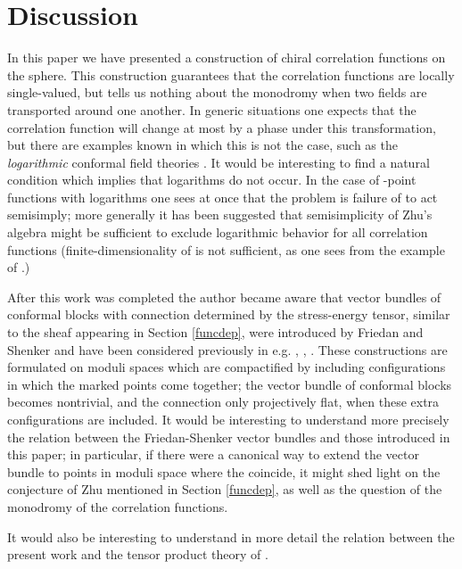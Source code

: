 \documentclass[a4paper,12pt]{article}
\providecommand{\uu}{{\mathbf u}}
\providecommand{\F}{{\mathcal H}}
\providecommand{\ti}[1]{\textit{#1}}
\begin{document}
\section{Discussion} \label{discussion}
In this paper we have presented a construction of chiral correlation functions on the sphere.  This
construction guarantees that the correlation functions are locally single-valued, but tells us nothing
about the monodromy when two fields are transported around one another.  In generic situations one expects that the
correlation function will change at most by a phase under this transformation, but there are examples known in which this
is not the case, such as the \ti{logarithmic} conformal field theories \cite{log}.  It would be interesting to find
a natural condition which implies that logarithms do not occur.  In the case of \coordHE{}-point functions with
logarithms one sees at once that the problem is failure of \coordHE{} to act semisimply; more generally 
it has been suggested \cite{Gpriv} that semisimplicity of Zhu's algebra might be sufficient to exclude
logarithmic behavior for all correlation functions (finite-dimensionality of \myHighlight{$\F / C_2$}\coordHE{} is not sufficient, as one
sees \cite{Gpriv} from the example of \cite{Glog}.)

After this work was completed the author became aware that vector bundles of conformal blocks with connection 
determined by the stress-energy tensor, 
similar to the sheaf \coordHE{} appearing in Section \ref{funcdep}, were introduced by Friedan and Shenker and
have been considered previously in e.g. \cite{FS}, \cite{Felder},
\cite{FS2}.  These constructions are formulated on moduli spaces which are compactified by including
configurations in which the marked points come together; the vector bundle of conformal blocks becomes
nontrivial, and the connection only projectively flat, when these extra configurations are included.
It would be interesting to understand more precisely the relation between the Friedan-Shenker vector bundles
and those introduced in this paper; in particular, if there were a canonical way to extend the vector bundle \myHighlight{$\F / O_\uu$}\coordHE{}
to points in moduli space where the \coordHE{} coincide, it might shed light on the conjecture of Zhu mentioned in Section \ref{funcdep},
as well as the question of the monodromy of the correlation functions.

It would also be interesting to understand in more detail the
relation between the present work and the tensor product theory
of \cite{HL}.
\end{document}
